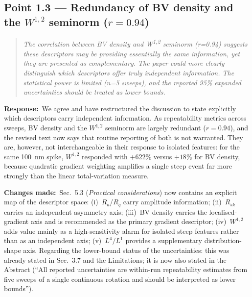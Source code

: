 \documentclass[11pt,a4paper]{article}
\newenvironment{reviewercomment}%
{\par\medskip\noindent\begin{quotation}\itshape\color{black!70}}%
{\end{quotation}\medskip}
\newcommand{\response}{\par\noindent\textbf{Response:}\ }
\newcommand{\changes}{\par\noindent\textbf{Changes made:}\ }
\begin{document}
\subsection*{Point 1.3 --- Redundancy of BV density and the $W^{1,2}$ seminorm ($r = 0.94$)}
\begin{reviewercomment}
The correlation between BV density and W\textsuperscript{1,2} seminorm (r=0.94) suggests these descriptors may be providing essentially the same information, yet they are presented as complementary. The paper could more clearly distinguish which descriptors offer truly independent information. The statistical power is limited (n=5 sweeps), and the reported 95\% expanded uncertainties should be treated as lower bounds.
\end{reviewercomment}
\response We agree and have restructured the discussion to state explicitly which descriptors carry independent information. As repeatability metrics across sweeps, BV density and the $W^{1,2}$ seminorm are largely redundant ($r=0.94$), and the revised text now says that routine reporting of both is not warranted. They are, however, not interchangeable in their response to isolated features: for the same 100~nm spike, $W^{1,2}$ responded with $+622\%$ versus $+18\%$ for BV density, because quadratic gradient weighting amplifies a single steep event far more strongly than the linear total-variation measure.
\changes Sec.~5.3 (\emph{Practical considerations}) now contains an explicit map of the descriptor space: (i)~$R_a$/$R_q$ carry amplitude information; (ii)~$R_{sk}$ carries an independent asymmetry axis; (iii)~BV density carries the localised-gradient axis and is recommended as the primary gradient descriptor; (iv)~$W^{1,2}$ adds value mainly as a high-sensitivity alarm for isolated steep features rather than as an independent axis; (v)~$L^4/L^1$ provides a supplementary distribution-shape axis. Regarding the lower-bound status of the uncertainties: this was already stated in Sec.~3.7 and the Limitations; it is now also stated in the Abstract (``All reported uncertainties are within-run repeatability estimates from five sweeps of a single continuous rotation and should be interpreted as lower bounds'').
\end{document}
